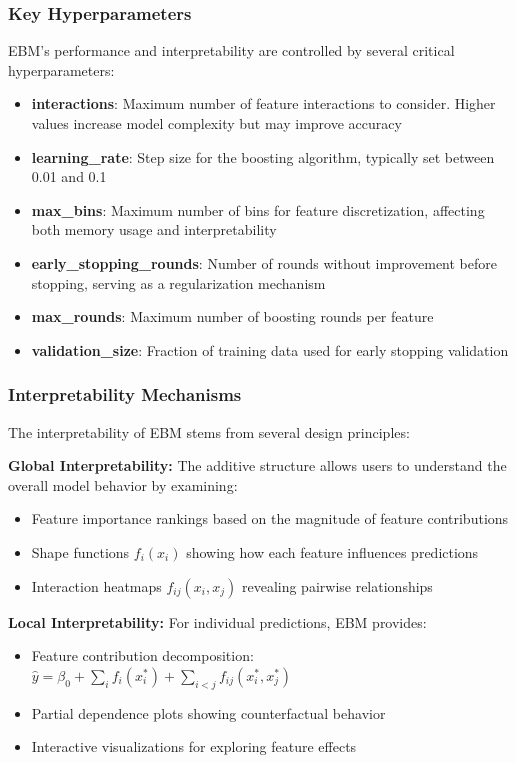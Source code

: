 \documentclass[12pt]{article}
\begin{document}
\subsubsection{Key Hyperparameters}

EBM's performance and interpretability are controlled by several critical hyperparameters:

\begin{itemize}
\item \textbf{interactions}: Maximum number of feature interactions to consider. Higher values increase model complexity but may improve accuracy
\item \textbf{learning\_rate}: Step size for the boosting algorithm, typically set between 0.01 and 0.1
\item \textbf{max\_bins}: Maximum number of bins for feature discretization, affecting both memory usage and interpretability
\item \textbf{early\_stopping\_rounds}: Number of rounds without improvement before stopping, serving as a regularization mechanism
\item \textbf{max\_rounds}: Maximum number of boosting rounds per feature
\item \textbf{validation\_size}: Fraction of training data used for early stopping validation
\end{itemize}

\subsubsection{Interpretability Mechanisms}

The interpretability of EBM stems from several design principles:

\textbf{Global Interpretability:} The additive structure allows users to understand the overall model behavior by examining:
\begin{itemize}
\item Feature importance rankings based on the magnitude of feature contributions
\item Shape functions $f_i(x_i)$ showing how each feature influences predictions
\item Interaction heatmaps $f_{ij}(x_i, x_j)$ revealing pairwise relationships
\end{itemize}

\textbf{Local Interpretability:} For individual predictions, EBM provides:
\begin{itemize}
\item Feature contribution decomposition: $\hat{y} = \beta_0 + \sum_{i} f_i(x_i^*) + \sum_{i<j} f_{ij}(x_i^*, x_j^*)$
\item Partial dependence plots showing counterfactual behavior
\item Interactive visualizations for exploring feature effects
\end{itemize}
\end{document}

